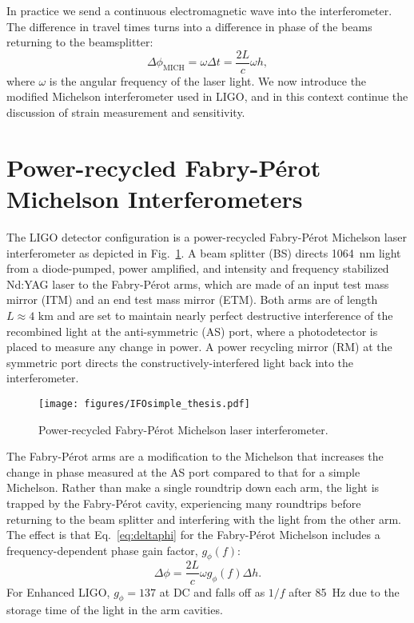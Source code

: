 In practice we send a
continuous electromagnetic wave into the interferometer. The
difference in travel times turns into a difference in phase of
the beams returning to the beamsplitter:
\begin{equation}
\Delta \phi_{\mathrm{MICH}} = \omega \Delta t = \frac{2 L}{c} \omega h,
\label{eq:deltaphi}
\end{equation}
where $\omega$ is the angular frequency of the laser light. We now
introduce the modified Michelson interferometer used in LIGO, and in
this context continue the discussion of strain measurement and
sensitivity.




\section{Power-recycled Fabry-P\'{e}rot Michelson Interferometers} 
The LIGO detector configuration is a power-recycled Fabry-P\'{e}rot
Michelson laser interferometer as depicted in
Fig.~\ref{fig:IFOschematic}. A beam splitter (BS) directs 1064~nm
light from a diode-pumped, power amplified, and intensity and
frequency stabilized Nd:YAG laser to the Fabry-P\'{e}rot arms, which are
made of an input test mass mirror (ITM) and an end test mass mirror
(ETM). Both arms are of length $L \approx 4 \text{ km}$ and are set to maintain nearly
perfect destructive interference of the recombined light at the
anti-symmetric (AS) port, where a photodetector is placed to measure
any change in power. A power recycling mirror (RM) at the symmetric
port directs the constructively-interfered light back into the
interferometer.

\begin{figure}
\begin{centering}
\texttt{[image: figures/IFOsimple\_thesis.pdf]}
\caption[Power-recycled Fabry-P\'{e}rot Michelson laser
interferometer]{Power-recycled Fabry-P\'{e}rot Michelson laser
  interferometer.}
\label{fig:IFOschematic}
\end{centering}
\end{figure}

The Fabry-P\'{e}rot arms are a modification to the Michelson that
increases the change in phase measured at the AS port compared to that
for a simple Michelson. Rather than make a single roundtrip down each
arm, the light is trapped by the Fabry-P\'{e}rot cavity, experiencing many
roundtrips before returning to the beam splitter and interfering with
the light from the other arm. The effect is that Eq.~\ref{eq:deltaphi}
for the Fabry-P\'{e}rot Michelson includes a frequency-dependent phase
gain factor, $g_{\phi}(f)$:
\begin{equation}
\Delta \phi = \frac{2 L}{c} \omega g_{\phi}(f) \Delta h.
\label{eq:deltaphi}
\end{equation}
For Enhanced LIGO, $g_{\phi} = 137$ at DC and falls off as $1/f$ after
85~Hz due to the storage time of the light in the arm cavities.


